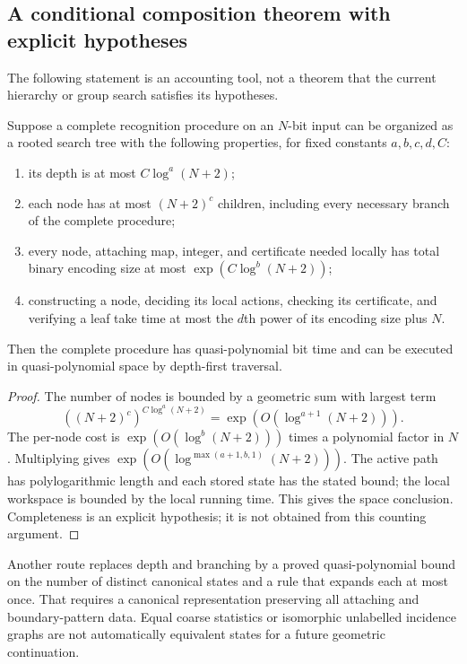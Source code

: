 \subsection{A conditional composition theorem with explicit hypotheses}

The following statement is an accounting tool, not a theorem that the current
hierarchy or group search satisfies its hypotheses.

\begin{theorem}
Suppose a complete recognition procedure on an $N$-bit input can be organized
as a rooted search tree with the following properties, for fixed constants
$a,b,c,d,C$:
\begin{enumerate}
\item its depth is at most $C\log^a(N+2)$;
\item each node has at most $(N+2)^c$ children, including every necessary
branch of the complete procedure;
\item every node, attaching map, integer, and certificate needed locally
has total binary encoding size at most $\exp(C\log^b(N+2))$;
\item constructing a node, deciding its local actions, checking its
certificate, and verifying a leaf take time at most the $d$th power of its
encoding size plus $N$.
\end{enumerate}
Then the complete procedure has quasi-polynomial bit time and can be
executed in quasi-polynomial space by depth-first traversal.
\label{thm:conditional-qp}
\end{theorem}
\begin{proof}
The number of nodes is bounded by a geometric sum with largest term
\[
 ((N+2)^c)^{C\log^a(N+2)}
 =\exp(O(\log^{a+1}(N+2))).
\]
The per-node cost is $\exp(O(\log^b(N+2)))$ times a polynomial factor in
$N$. Multiplying gives
$\exp(O(\log^{\max(a+1,b,1)}(N+2)))$. The active path has
polylogarithmic length and each stored state has the stated bound; the local
workspace is bounded by the local running time. This gives the space
conclusion. Completeness is an explicit hypothesis; it is not
obtained from this counting argument.
\end{proof}

Another route replaces depth and branching by a proved quasi-polynomial
bound on the number of distinct canonical states and a rule that expands
each at most once. That requires a canonical representation preserving all
attaching and boundary-pattern data. Equal coarse statistics or isomorphic
unlabelled incidence graphs are not automatically equivalent states for a
future geometric continuation.

